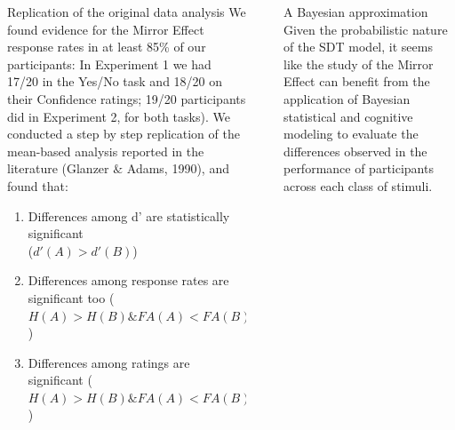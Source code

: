 \documentclass[final]{beamer}
\newlength{\sepwid}
\newlength{\onecolwid}
\newlength{\twocolwid}
\begin{document}
\begin{frame}[t]
\begin{columns}[t]
\begin{column}{\onecolwid}
\begin{alertblock}{Replication of the original data analysis}
We found evidence for the Mirror Effect response rates in at least 85\% of our participants: In Experiment 1 we had 17/20 in the Yes/No task and 18/20 on their Confidence ratings; 19/20 participants did in Experiment 2, for both tasks). We conducted a step by step replication of the mean-based analysis reported in the literature (Glanzer $\&$ Adams, 1990), and found that:
\begin{enumerate}
\item Differences among d' are statistically significant \\
($d'(A) > d'(B)$)
\item Differences among response rates are significant too ($H(A)>H(B) \& FA(A)<FA(B)$)
\item Differences among ratings are significant ($H(A)>H(B) \& FA(A)<FA(B)$)
\end{enumerate}
\end{alertblock} 



\end{column} %
\begin{column}{\sepwid}\end{column} %
\begin{column}{\twocolwid} %



\begin{alertblock}{A Bayesian approximation}
Given the probabilistic nature of the SDT model, it seems like the study of the Mirror Effect can benefit from the application of Bayesian statistical and cognitive modeling to evaluate the differences observed in the performance of participants across each class of stimuli.
\end{alertblock} 


\end{column}
\end{columns}
\end{frame}
\end{document}
